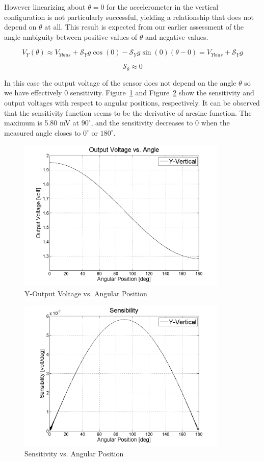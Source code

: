 \documentclass{article}
\theoremstyle{plain}
\theoremstyle{definition}
\theoremstyle{remark}
\newcommand{\Sens}{\mathcal{S}}
\begin{document}
However linearizing about $\theta = 0$ for the accelerometer in the vertical configuration is not particularly successful,  yielding a relationship that does not depend on $\theta$ at all.  This result is expected from our earlier assessment of the angle ambiguity between positive values of $\theta$ and negative values.  

$$V_{Y}(\theta) \approx V_{Ybias} + \Sens_{Y} g \cos(0) - \Sens_{Y} g \sin(0) (\theta - 0) = V_{Ybias} + \Sens_{Y} g $$

$$ \Sens_\theta \approx 0 $$

In this case the output voltage of the sensor does not depend on the angle $\theta$ so we have effectively 0 sensitivity. Figure~\ref{Y_Vol_vs_Angle} and Figure~\ref{Y_Sensibility} show the sensitivity and output voltages with respect to angular positions, respectively. It can be observed that the sensitivity function seems to be the derivative of arcsine function. The maximum is 5.80 mV at $90^\circ$, and the sensitivity decreases to 0 when the measured angle closes to $0^\circ$ or $180^\circ$.

\begin{figure}[hbt]
\begin{center}
\includegraphics[width = 10cm]{Y_Vol_vs_Angle.png}
\caption{Y-Output Voltage vs. Angular Position}
\label{Y_Vol_vs_Angle}
\end{center}
\end{figure}

\begin{figure}[hbt]
\begin{center}
\includegraphics[width = 10cm]{Y_Sensibility.png}
\caption{Sensitivity vs. Angular Position}
\label{Y_Sensibility}
\end{center}
\end{figure}
\end{document}
